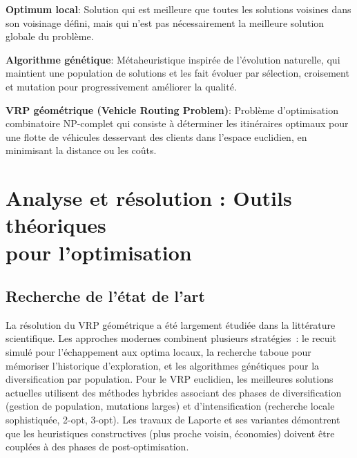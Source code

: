 \vspace{0.5cm}

\noindent \textbf{Optimum local}: Solution qui est meilleure que toutes les solutions voisines dans son voisinage défini, mais qui n'est pas nécessairement la meilleure solution globale du problème.

\vspace{0.5cm}

\noindent \textbf{Algorithme génétique}: Métaheuristique inspirée de l'évolution naturelle, qui maintient une population de solutions et les fait évoluer par sélection, croisement et mutation pour progressivement améliorer la qualité.

\vspace{0.5cm}

\noindent \textbf{VRP géométrique (Vehicle Routing Problem)}: Problème d'optimisation combinatoire NP-complet qui consiste à déterminer les itinéraires optimaux pour une flotte de véhicules desservant des clients dans l'espace euclidien, en minimisant la distance ou les coûts.

\newpage

\section*{Analyse et résolution : Outils théoriques \\ pour l'optimisation}

\subsection*{Recherche de l'état de l'art}
{}

\noindent La résolution du VRP géométrique a été largement étudiée dans la littérature scientifique. Les approches modernes combinent plusieurs stratégies~: le recuit simulé pour l'échappement aux optima locaux, la recherche taboue pour mémoriser l'historique d'exploration, et les algorithmes génétiques pour la diversification par population. Pour le VRP euclidien, les meilleures solutions actuelles utilisent des méthodes hybrides associant des phases de diversification (gestion de population, mutations larges) et d'intensification (recherche locale sophistiquée, 2-opt, 3-opt). Les travaux de Laporte et ses variantes démontrent que les heuristiques constructives (plus proche voisin, économies) doivent être couplées à des phases de post-optimisation.


